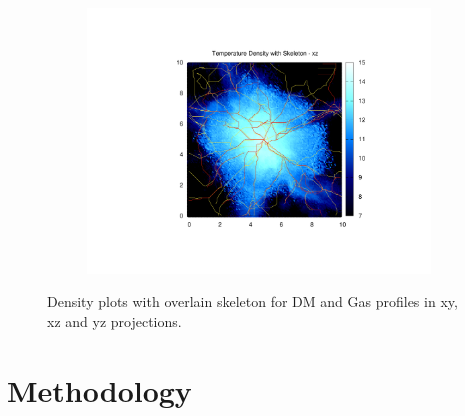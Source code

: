 \documentclass[journal]{IEEEtran}
\begin{document}
\begin{figure}[!t]
\begin{subfigure}[t]{0.3\textwidth}
		\includegraphics[width=\linewidth]{TempDenSkelxz}
	\end{subfigure}
\label{fig:densities}
\caption{Density plots with overlain skeleton for DM and Gas profiles in xy, xz and yz projections.}
\end{figure}

\section{Methodology}
\end{document}
